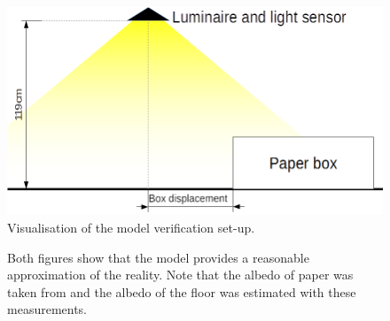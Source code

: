 \begin{figure}[]
	\centering
	\includegraphics[width=\textwidth]{pics/Verification_Situation.png}
	\caption{Visualisation of the model verification set-up.}
	\label{fig:VerificationSetup}
\end{figure}

\begin{figure}
	\centering     %
	\label{fig:VerificationResults}
	\caption{Both figures show that the model provides a reasonable approximation of the reality. Note that the albedo of paper was taken from \cite{Albedo} and the albedo of the floor was estimated with these measurements.}
\end{figure}

